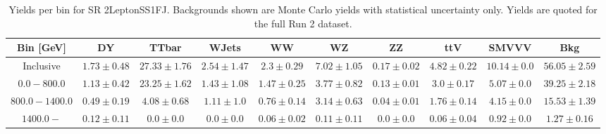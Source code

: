 
\begin{table}[!htbp]
    \small
    \center
    \begin{tabular}{c|c|c|c|c|c|c|c|c||c}
    Bin [GeV] & DY & TTbar & WJets & WW & WZ & ZZ & ttV & SMVVV & Bkg\\
    \hline
    Inclusive & $1.73 \pm 0.48$ & $27.33 \pm 1.76$ & $2.54 \pm 1.47$ & $2.3 \pm 0.29$ & $7.02 \pm 1.05$ & $0.17 \pm 0.02$ & $4.82 \pm 0.22$ & $10.14 \pm 0.0$ & $56.05 \pm 2.59$\\
    \hline
    $0.0-800.0$ & $1.13 \pm 0.42$ & $23.25 \pm 1.62$ & $1.43 \pm 1.08$ & $1.47 \pm 0.25$ & $3.77 \pm 0.82$ & $0.13 \pm 0.01$ & $3.0 \pm 0.17$ & $5.07 \pm 0.0$ & $39.25 \pm 2.18$\\
    \hline
    $800.0-1400.0$ & $0.49 \pm 0.19$ & $4.08 \pm 0.68$ & $1.11 \pm 1.0$ & $0.76 \pm 0.14$ & $3.14 \pm 0.63$ & $0.04 \pm 0.01$ & $1.76 \pm 0.14$ & $4.15 \pm 0.0$ & $15.53 \pm 1.39$\\
    \hline
    $1400.0-$ & $0.12 \pm 0.11$ & $0.0 \pm 0.0$ & $0.0 \pm 0.0$ & $0.06 \pm 0.02$ & $0.11 \pm 0.11$ & $0.0 \pm 0.0$ & $0.06 \pm 0.04$ & $0.92 \pm 0.0$ & $1.27 \pm 0.16$\\
\end{tabular}
    \caption{Yields per bin for SR 2LeptonSS1FJ. Backgrounds shown are Monte Carlo yields with statistical uncertainty only. Yields are quoted for the full Run 2 dataset.}
    \label{tab:2LeptonSS1FJ$bins}
\end{table}
